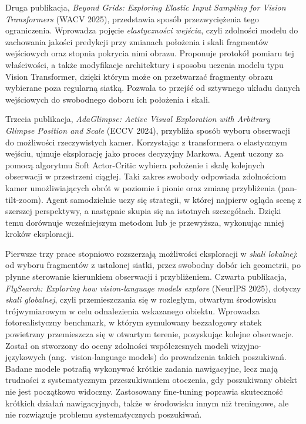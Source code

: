 \begin{polish}
Druga publikacja, \emph{Beyond Grids: Exploring Elastic Input Sampling for Vision Transformers} (WACV 2025), przedstawia sposób przezwyciężenia tego ograniczenia. Wprowadza pojęcie \emph{elastyczności wejścia}, czyli zdolności modelu do zachowania jakości predykcji przy zmianach położenia i skali fragmentów wejściowych oraz stopnia pokrycia nimi obrazu. Proponuje protokół pomiaru tej właściwości, a także modyfikacje architektury i sposobu uczenia modelu typu Vision Transformer, dzięki którym może on przetwarzać fragmenty obrazu wybierane poza regularną siatką. Pozwala to przejść od sztywnego układu danych wejściowych do swobodnego doboru ich położenia i skali.

Trzecia publikacja, \emph{AdaGlimpse: Active Visual Exploration with Arbitrary Glimpse Position and Scale} (ECCV 2024), przybliża sposób wyboru obserwacji do możliwości rzeczywistych kamer. Korzystając z transformera o elastycznym wejściu, ujmuje eksplorację jako proces decyzyjny Markowa. Agent uczony za pomocą algorytmu Soft Actor-Critic wybiera położenie i skalę kolejnych obserwacji w przestrzeni ciągłej. Taki zakres swobody odpowiada zdolnościom kamer umożliwiających obrót w poziomie i pionie oraz zmianę przybliżenia (pan-tilt-zoom). Agent samodzielnie uczy się strategii, w której najpierw ogląda scenę z szerszej perspektywy, a następnie skupia się na istotnych szczegółach. Dzięki temu dorównuje wcześniejszym metodom lub je przewyższa, wykonując mniej kroków eksploracji.

Pierwsze trzy prace stopniowo rozszerzają możliwości eksploracji w \emph{skali lokalnej}: od wyboru fragmentów z ustalonej siatki, przez swobodny dobór ich geometrii, po płynne sterowanie kierunkiem obserwacji i przybliżeniem. Czwarta publikacja, \emph{FlySearch: Exploring how vision-language models explore} (NeurIPS 2025), dotyczy \emph{skali globalnej}, czyli przemieszczania się w rozległym, otwartym środowisku trójwymiarowym w celu odnalezienia wskazanego obiektu. Wprowadza fotorealistyczny benchmark, w którym symulowany bezzałogowy statek powietrzny przemieszcza się w otwartym terenie, pozyskując kolejne obserwacje. Został on stworzony do oceny zdolności współczesnych modeli wizyjno-językowych (ang.\ vision-language models) do prowadzenia takich poszukiwań. Badane modele potrafią wykonywać krótkie zadania nawigacyjne, lecz mają trudności z systematycznym przeszukiwaniem otoczenia, gdy poszukiwany obiekt nie jest początkowo widoczny. Zastosowany fine-tuning poprawia skuteczność krótkich działań nawigacyjnych, także w środowisku innym niż treningowe, ale nie rozwiązuje problemu systematycznych poszukiwań.


\end{polish}
